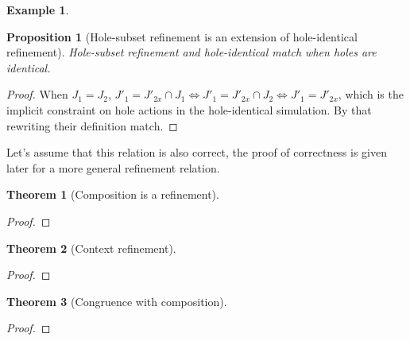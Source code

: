 \documentclass{article}
\theoremstyle{plain}
\newtheorem{thm}{Theorem}
\newtheorem{prop}{Proposition}
\theoremstyle{definition}
\newtheorem{exi}{Example}
\begin{document}
\begin{exi} %
\end{exi}

\begin{prop}[Hole-subset refinement is an extension of hole-identical refinement]
Hole-subset refinement and hole-identical match when holes are identical.
\end{prop}
\begin{proof}
When \(J_1 = J_2\), \(J'_1 = J'_{2x} \cap J_1 \iff J'_1 = J'_{2x} \cap J_2 \iff J'_1 = J'_{2x}\), which is the implicit constraint on hole actions in the hole-identical simulation.
By that rewriting their definition match.
\end{proof}
Let's assume that this relation is also correct, the proof of correctness is given later for a more general refinement relation.
\begin{thm}[Composition is a refinement]
\end{thm}
\begin{proof}
\end{proof}
\begin{thm}[Context refinement]
\end{thm}
\begin{proof}
\end{proof}
\begin{thm}[Congruence with composition]
\end{thm}
\begin{proof}
\end{proof}
\end{document}
